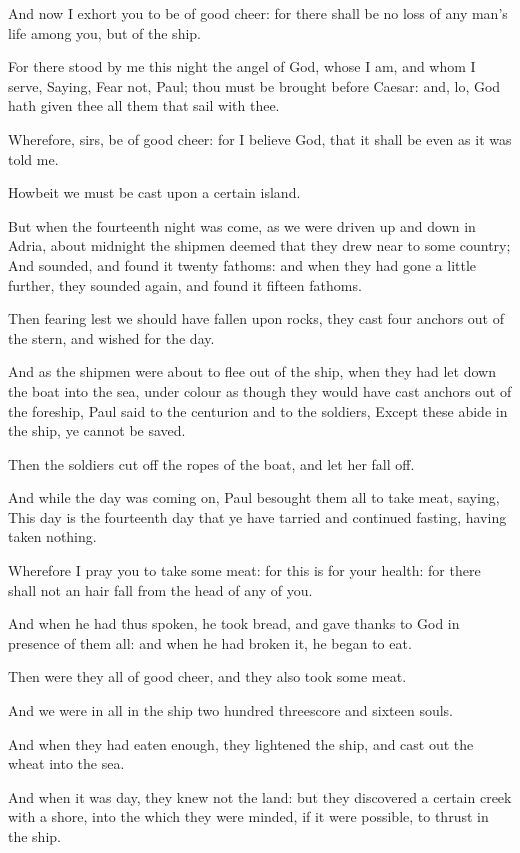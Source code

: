 \verse And now I exhort you to be of good cheer: for there shall be no loss of any man's life among you, but of the ship.

\verse For there stood by me this night the angel of God, whose I am, and whom I serve, \verse Saying, Fear not, Paul; thou must be brought before Caesar: and, lo, God hath given thee all them that sail with thee.

\verse Wherefore, sirs, be of good cheer: for I believe God, that it shall be even as it was told me.

\verse Howbeit we must be cast upon a certain island.

\verse But when the fourteenth night was come, as we were driven up and down in Adria, about midnight the shipmen deemed that they drew near to some country; \verse And sounded, and found it twenty fathoms: and when they had gone a little further, they sounded again, and found it fifteen fathoms.

\verse Then fearing lest we should have fallen upon rocks, they cast four anchors out of the stern, and wished for the day.

\verse And as the shipmen were about to flee out of the ship, when they had let down the boat into the sea, under colour as though they would have cast anchors out of the foreship, \verse Paul said to the centurion and to the soldiers, Except these abide in the ship, ye cannot be saved.

\verse Then the soldiers cut off the ropes of the boat, and let her fall off.

\verse And while the day was coming on, Paul besought them all to take meat, saying, This day is the fourteenth day that ye have tarried and continued fasting, having taken nothing.

\verse Wherefore I pray you to take some meat: for this is for your health: for there shall not an hair fall from the head of any of you.

\verse And when he had thus spoken, he took bread, and gave thanks to God in presence of them all: and when he had broken it, he began to eat.

\verse Then were they all of good cheer, and they also took some meat.

\verse And we were in all in the ship two hundred threescore and sixteen souls.

\verse And when they had eaten enough, they lightened the ship, and cast out the wheat into the sea.

\verse And when it was day, they knew not the land: but they discovered a certain creek with a shore, into the which they were minded, if it were possible, to thrust in the ship.

